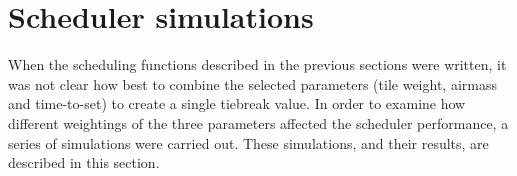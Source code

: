
\section{Scheduler simulations}
\label{sec:scheduler_sims}


\begin{colsection}

When the scheduling functions described in the previous sections were written, it was not clear how best to combine the selected parameters (tile weight, airmass and time-to-set) to create a single tiebreak value. In order to examine how different weightings of the three parameters affected the scheduler performance, a series of simulations were carried out. These simulations, and their results, are described in this section.

\end{colsection}



